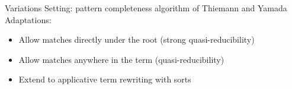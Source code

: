 


\begin{frame}{Variations}
Setting: pattern completeness algorithm of Thiemann and Yamada\\
\vspace{0.5cm}
Adaptations:
\begin{itemize}
    \item Allow matches directly under the root (strong quasi-reducibility)
    \item Allow matches anywhere in the term (quasi-reducibility)
    \item Extend to applicative term rewriting with sorts
\end{itemize}
    
\end{frame}

